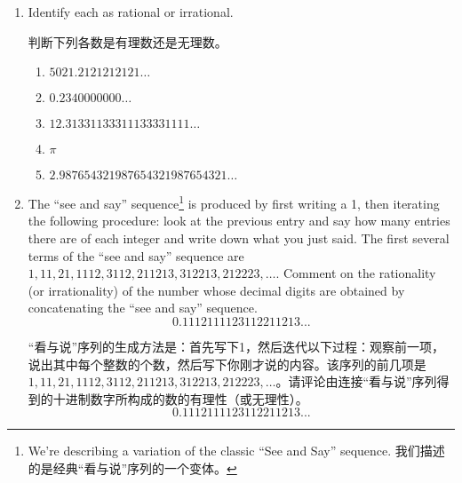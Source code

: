\begin{enumerate}
  \vfill
  
  
  \item Identify each as rational or irrational.
  
  判断下列各数是有理数还是无理数。
  \begin{enumerate}
  \item $5021.2121212121\ldots$
  \item $0.2340000000\ldots$
  \item $12.31331133311133331111\ldots$
  \item $\pi$
  \item $2.987654321987654321987654321\ldots$
  \end{enumerate}
  
  \vfill
  
  
  \vfill
  
  \textbookpagebreak
  
  \item The ``see and say'' sequence\footnote{We're describing a variation of the classic ``See and Say'' sequence. 我们描述的是经典“看与说”序列的一个变体。} is produced by first writing a 1, 
  then iterating the following procedure:  look at the previous entry 
  and say how many entries there are of each integer and write down what 
  you just said.
  The first several terms of the ``see and say'' sequence 
  are $1, 11, 21, 1112, 3112, 211213, 312213, 212223, \ldots$.
  Comment on the
  rationality (or irrationality) of the number whose decimal digits are obtained 
  by concatenating the ``see and say'' sequence.
  \[ 0.1112111123112211213... \]
  
  “看与说”序列的生成方法是：首先写下1，然后迭代以下过程：观察前一项，说出其中每个整数的个数，然后写下你刚才说的内容。该序列的前几项是 $1, 11, 21, 1112, 3112, 211213, 312213, 212223, \ldots$。请评论由连接“看与说”序列得到的十进制数字所构成的数的有理性（或无理性）。
  \[ 0.1112111123112211213... \]
  
  \vfill
  
\end{enumerate}
